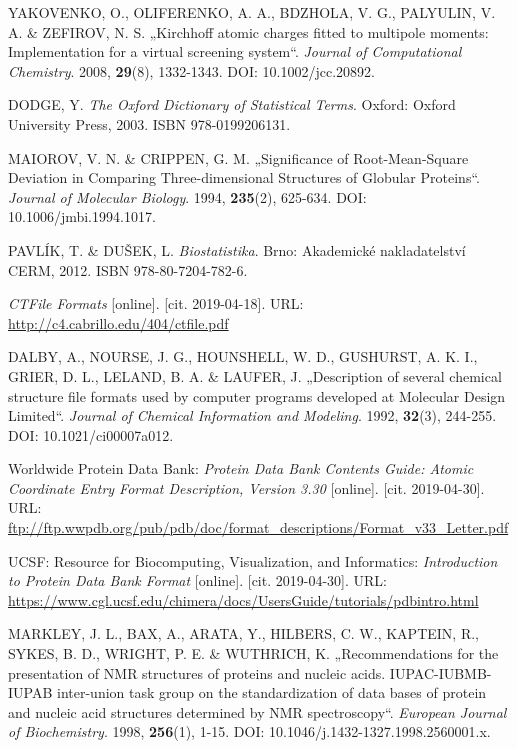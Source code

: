 \begin{thebibliography}{10}
YAKOVENKO, O., OLIFERENKO, A. A., BDZHOLA, V. G., PALYULIN, V. A. \& ZEFIROV, N. S. „Kirchhoff atomic charges fitted to multipole moments: Implementation for a virtual screening system“. \textit{Journal of Computational Chemistry}. 2008, \textbf{29}(8), 1332-1343. DOI: 10.1002/jcc.20892.

DODGE, Y. \textit{The Oxford Dictionary of Statistical Terms}. Oxford: Oxford University Press, 2003. ISBN 978-0199206131.

MAIOROV, V. N. \& CRIPPEN, G. M. „Significance of Root-Mean-Square Deviation in Comparing Three-dimensional Structures of Globular Proteins“. \textit{Journal of Molecular Biology}. 1994, \textbf{235}(2), 625-634. DOI: 10.1006/jmbi.1994.1017. 

PAVLÍK, T. \& DUŠEK, L. \textit{Biostatistika}. Brno: Akademické nakladatelství CERM, 2012. ISBN 978-80-7204-782-6.

\textit{CTFile Formats} [online]. [cit. 2019-04-18]. URL: \url{http://c4.cabrillo.edu/404/ctfile.pdf}

DALBY, A., NOURSE, J. G., HOUNSHELL, W. D., GUSHURST, A. K. I., GRIER, D. L., LELAND, B. A. \& LAUFER, J. „Description of several chemical structure file formats used by computer programs developed at Molecular Design Limited“. \textit{Journal of Chemical Information and Modeling}. 1992, \textbf{32}(3), 244-255. DOI: 10.1021/ci00007a012.

Worldwide Protein Data Bank: \textit{Protein Data Bank Contents Guide: Atomic Coordinate Entry Format Description, Version 3.30} [online]. [cit. 2019-04-30]. URL: \url{ftp://ftp.wwpdb.org/pub/pdb/doc/format_descriptions/Format_v33_Letter.pdf}

UCSF: Resource for Biocomputing, Visualization, and Informatics: \textit{Introduction to Protein Data Bank Format} [online]. [cit. 2019-04-30]. URL: \url{https://www.cgl.ucsf.edu/chimera/docs/UsersGuide/tutorials/pdbintro.html}

MARKLEY, J. L., BAX, A., ARATA, Y., HILBERS, C. W., KAPTEIN, R., SYKES, B. D., WRIGHT, P. E. \& WUTHRICH, K. „Recommendations for the presentation of NMR structures of proteins and nucleic acids. IUPAC-IUBMB-IUPAB inter-union task group on the standardization of data bases of protein and nucleic acid structures determined by NMR spectroscopy“. \textit{European Journal of Biochemistry}. 1998, \textbf{256}(1), 1-15. DOI: 10.1046/j.1432-1327.1998.2560001.x.


\end{thebibliography}
